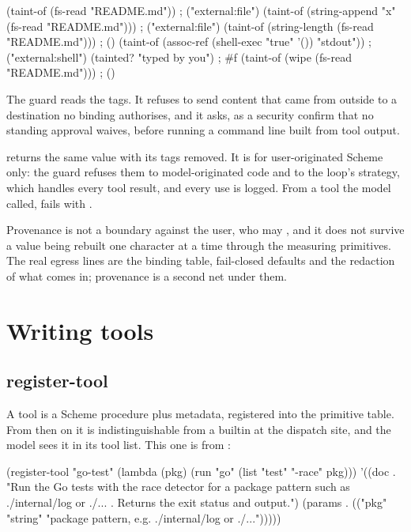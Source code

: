 \begin{scm}
(taint-of (fs-read "README.md"))                          ; ("external:file")
(taint-of (string-append "x" (fs-read "README.md")))      ; ("external:file")
(taint-of (string-length (fs-read "README.md")))          ; ()
(taint-of (assoc-ref (shell-exec "true" '()) "stdout"))   ; ("external:shell")
(tainted? "typed by you")                                 ; #f
(taint-of (wipe (fs-read "README.md")))                   ; ()
\end{scm}

The guard reads the tags. It refuses to send content that came from outside
to a destination no binding authorises, and it asks, as a security confirm
that no standing approval waives, before running a command line built from
tool output.

 returns the same value with its
tags removed. It is for user-originated Scheme only: the guard refuses
them to model-originated code and to the loop's strategy, which handles
every tool result, and every use is logged. From a tool the model called,
 fails with .

Provenance is not a boundary against the user, who may , and it
does not survive a value being rebuilt one character at a time through the
measuring primitives. The real egress lines are the binding table,
fail-closed defaults and the redaction of what comes in; provenance is a
second net under them.

\chapter{Writing tools}

\section{register-tool}\label{sch:register}

A tool is a Scheme procedure plus metadata, registered into the primitive
table. From then on it is indistinguishable from a builtin at the dispatch
site, and the model sees it in its tool list. This one is from
:

\begin{scm}
(register-tool "go-test"
  (lambda (pkg) (run "go" (list "test" "-race" pkg)))
  '((doc . "Run the Go tests with the race detector for a package pattern such as ./internal/log or ./... . Returns the exit status and output.")
    (params . (("pkg" "string" "package pattern, e.g. ./internal/log or ./...")))))
\end{scm}

